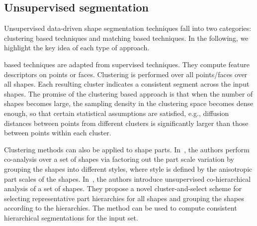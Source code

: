 \subsection{Unsupervised segmentation}

Unsupervised data-driven shape segmentation techniques fall into two categories: clustering based techniques and matching based techniques. In the following, we highlight the key idea of each type of approach.

 based techniques are adapted from supervised techniques. They compute feature descriptors on points or faces. Clustering is performed over all points/faces over all shapes. Each resulting cluster indicates a consistent segment across the input shapes. The promise of the clustering based approach is that when the number of shapes becomes large, the sampling density in the clustering space becomes dense enough, so that certain statistical assumptions are satisfied, e.g., diffusion distances between points from different clusters is significantly larger than those between points within each cluster. 

Clustering methods can also be applied to shape parts. In~\cite{Xu:2010:SCS}, the authors perform co-analysis over a set of shapes via factoring out the part scale variation by grouping the shapes into different styles, where style is defined by the anisotropic part scales of the shapes. In~\cite{van-Kaick:2013:CHA}, the authors introduce unsupervised co-hierarchical analysis of a set of shapes. They propose a novel cluster-and-select scheme for selecting representative part hierarchies for all shapes and grouping the shapes according to the hierarchies. The method can be used to compute consistent hierarchical segmentations for the input set.



